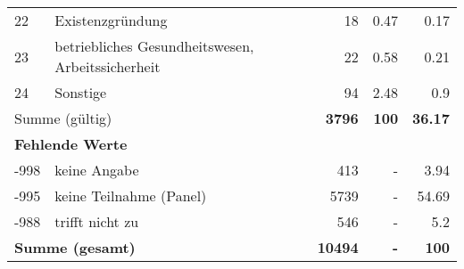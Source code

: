 \begin{longtable}{lXrrr}
        22 & \multicolumn{1}{X}{Existenzgründung} & %
          \num{18} &
          \num[round-mode=places,round-precision=2]{0.47} &
          \num[round-mode=places,round-precision=2]{0.17} \\

        23 & \multicolumn{1}{X}{betriebliches Gesundheitswesen, Arbeitssicherheit} & %
          \num{22} &
          \num[round-mode=places,round-precision=2]{0.58} &
          \num[round-mode=places,round-precision=2]{0.21} \\

        24 & \multicolumn{1}{X}{Sonstige} & %
          \num{94} &
          \num[round-mode=places,round-precision=2]{2.48} &
          \num[round-mode=places,round-precision=2]{0.9} \\

     \midrule
     \multicolumn{2}{l}{Summe (gültig)} &
       \textbf{\num{3796}} &
     \textbf{\num{100}} &
       \textbf{\num[round-mode=places,round-precision=2]{36.17}} \\
     \multicolumn{5}{l}{\textbf{Fehlende Werte}}\\
       -998 &
       keine Angabe &
         \num{413} &
        - &
         \num[round-mode=places,round-precision=2]{3.94} \\
       -995 &
       keine Teilnahme (Panel) &
         \num{5739} &
        - &
         \num[round-mode=places,round-precision=2]{54.69} \\
       -988 &
       trifft nicht zu &
         \num{546} &
        - &
         \num[round-mode=places,round-precision=2]{5.2} \\
     \midrule
     \multicolumn{2}{l}{\textbf{Summe (gesamt)}} &
          \textbf{\num{10494}} &
        \textbf{-} &
        \textbf{\num{100}} \\
     \bottomrule
     \end{longtable}
     
